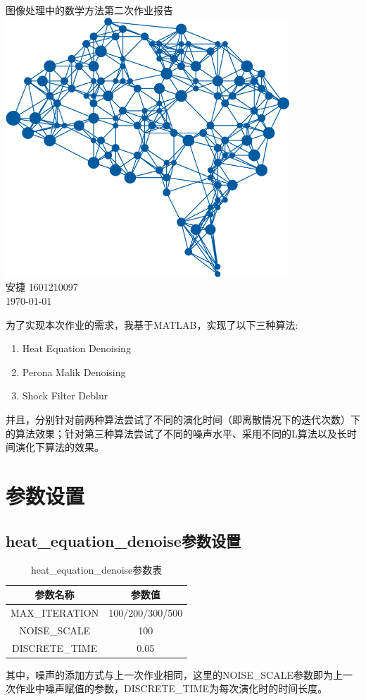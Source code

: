 \documentclass[a4paper, UTF8]{ctexrep}
\begin{document}
	\begin{titlepage}
		\centering
		\vspace{6cm}
		\LARGE{图像处理中的数学方法第二次作业报告}\\
		\vspace{3cm}
		\includegraphics[width=0.8\textwidth]{deepLearning.png}\\
		\vspace{4cm}
		\normalsize{安捷 1601210097}\\
		\normalsize{\today}
	\end{titlepage}
	为了实现本次作业的需求，我基于MATLAB，实现了以下三种算法:
	\begin{enumerate}
		\item Heat Equation Denoising
		\item Perona Malik Denoising
		\item Shock Filter Deblur
	\end{enumerate}
	并且，分别针对前两种算法尝试了不同的演化时间（即离散情况下的迭代次数）下的算法效果；针对第三种算法尝试了不同的噪声水平、采用不同的L算法以及长时间演化下算法的效果。
		\section{参数设置}
			\subsection{heat\_equation\_denoise参数设置}
				\begin{table}[htbp!]
					\centering
					\begin{tabular}{cc}
						\hline
						参数名称 & 参数值 \\
						\hline
						MAX\_ITERATION & 100/200/300/500 \\
						NOISE\_SCALE & 100 \\
						DISCRETE\_TIME & 0.05 \\
						\hline
					\end{tabular}
					\caption{heat\_equation\_denoise参数表}
				\end{table}
				其中，噪声的添加方式与上一次作业相同，这里的NOISE\_SCALE参数即为上一次作业中噪声赋值的参数，DISCRETE\_TIME为每次演化时的时间长度。
\end{document}
